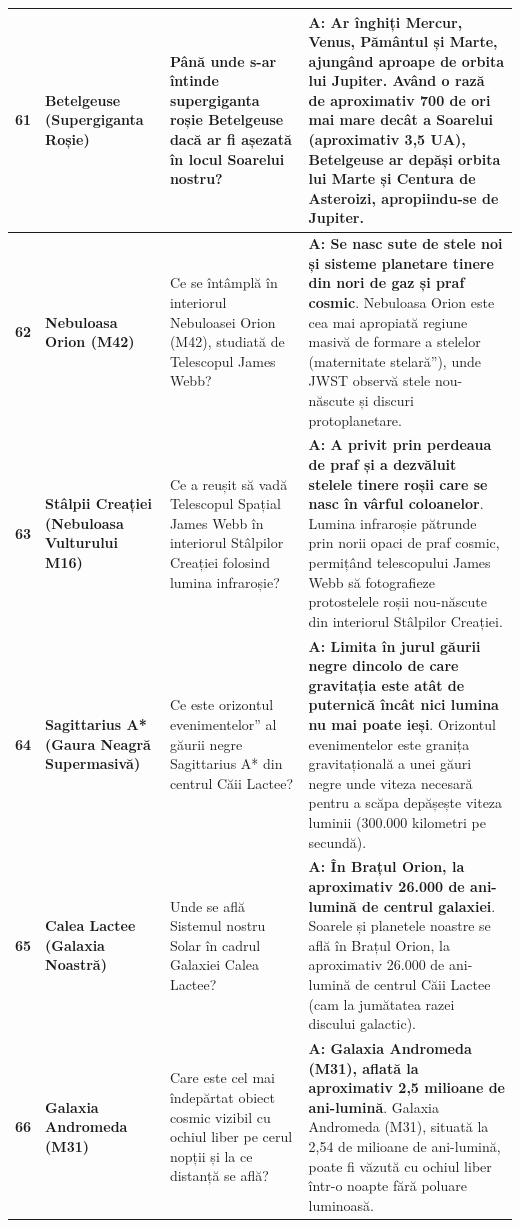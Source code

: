 \begin{longtable}{@{}r >{\raggedright\arraybackslash}p{2.7cm} >{\raggedright\arraybackslash}p{4.8cm} >{\raggedright\arraybackslash}p{6.5cm}@{}}
\textbf{61} & \textbf{Betelgeuse (Supergiganta Roșie)} & Până unde s-ar întinde supergiganta roșie Betelgeuse dacă ar fi așezată în locul Soarelui nostru? & \textbf{A: Ar înghiți Mercur, Venus, Pământul și Marte, ajungând aproape de orbita lui Jupiter}. {\footnotesize Având o rază de aproximativ 700 de ori mai mare decât a Soarelui (aproximativ 3,5 UA), Betelgeuse ar depăși orbita lui Marte și Centura de Asteroizi, apropiindu-se de Jupiter.} \\ \midrule
\textbf{62} & \textbf{Nebuloasa Orion (M42)} & Ce se întâmplă în interiorul Nebuloasei Orion (M42), studiată de Telescopul James Webb? & \textbf{A: Se nasc sute de stele noi și sisteme planetare tinere din nori de gaz și praf cosmic}. {\footnotesize Nebuloasa Orion este cea mai apropiată regiune masivă de formare a stelelor (\quotedblbase{}maternitate stelară\textquotedblright{}), unde JWST observă stele nou-născute și discuri protoplanetare.} \\ \midrule
\textbf{63} & \textbf{Stâlpii Creației (Nebuloasa Vulturului M16)} & Ce a reușit să vadă Telescopul Spațial James Webb în interiorul Stâlpilor Creației folosind lumina infraroșie? & \textbf{A: A privit prin perdeaua de praf și a dezvăluit stelele tinere roșii care se nasc în vârful coloanelor}. {\footnotesize Lumina infraroșie pătrunde prin norii opaci de praf cosmic, permițând telescopului James Webb să fotografieze protostelele roșii nou-născute din interiorul Stâlpilor Creației.} \\ \midrule
\textbf{64} & \textbf{Sagittarius A* (Gaura Neagră Supermasivă)} & Ce este \quotedblbase{}orizontul evenimentelor\textquotedblright{} al găurii negre Sagittarius A* din centrul Căii Lactee? & \textbf{A: Limita în jurul găurii negre dincolo de care gravitația este atât de puternică încât nici lumina nu mai poate ieși}. {\footnotesize Orizontul evenimentelor este granița gravitațională a unei găuri negre unde viteza necesară pentru a scăpa depășește viteza luminii (300.000 kilometri pe secundă).} \\ \midrule
\textbf{65} & \textbf{Calea Lactee (Galaxia Noastră)} & Unde se află Sistemul nostru Solar în cadrul Galaxiei Calea Lactee? & \textbf{A: În Brațul Orion, la aproximativ 26.000 de ani-lumină de centrul galaxiei}. {\footnotesize Soarele și planetele noastre se află în Brațul Orion, la aproximativ 26.000 de ani-lumină de centrul Căii Lactee (cam la jumătatea razei discului galactic).} \\ \midrule
\textbf{66} & \textbf{Galaxia Andromeda (M31)} & Care este cel mai îndepărtat obiect cosmic vizibil cu ochiul liber pe cerul nopții și la ce distanță se află? & \textbf{A: Galaxia Andromeda (M31), aflată la aproximativ 2,5 milioane de ani-lumină}. {\footnotesize Galaxia Andromeda (M31), situată la 2,54 de milioane de ani-lumină, poate fi văzută cu ochiul liber într-o noapte fără poluare luminoasă.} \\ \midrule

\end{longtable}
